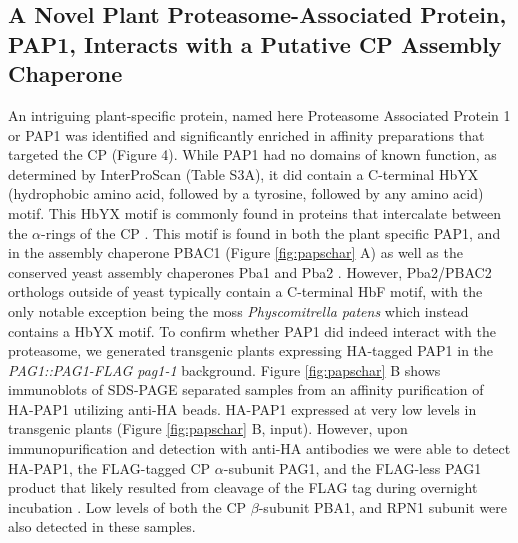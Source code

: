 \subsection{A Novel Plant Proteasome-Associated Protein, PAP1, Interacts with a Putative CP Assembly Chaperone}
An intriguing plant-specific protein, named here Proteasome Associated Protein 1 or PAP1 was identified and significantly enriched in affinity preparations that targeted the CP (Figure 4). While PAP1 had no domains of known function, as determined by InterProScan (Table S3A), it did contain a C-terminal HbYX (hydrophobic amino acid, followed by a tyrosine, followed by any amino acid) motif. This HbYX motif is commonly found in proteins that intercalate between the $\alpha$-rings of the CP \citep{kusmierczyk11}. This motif is found in both the plant specific PAP1, and in the assembly chaperone PBAC1 (Figure \ref{fig:papschar} A) as well as the conserved yeast assembly chaperones Pba1 and Pba2 \citep{kusmierczyk11}. However, Pba2/PBAC2 orthologs outside of yeast typically contain a C-terminal HbF motif, with the only notable exception being the moss \textit{Physcomitrella patens} which instead contains a HbYX motif.   To confirm whether PAP1 did indeed interact with the proteasome, we generated transgenic plants expressing HA-tagged PAP1 in the \textit{PAG1::PAG1-FLAG pag1-1} background. Figure \ref{fig:papschar} B shows immunoblots of SDS-PAGE separated samples from an affinity purification of HA-PAP1 utilizing anti-HA beads. HA-PAP1 expressed at very low levels in transgenic plants (Figure \ref{fig:papschar} B, input). However, upon immunopurification and detection with anti-HA antibodies we were able to detect HA-PAP1, the FLAG-tagged CP $\alpha$-subunit PAG1, and the FLAG-less PAG1 product that likely resulted from cleavage of the FLAG tag during overnight incubation \citep{book10}. Low levels of both the CP $\beta$-subunit PBA1, and RPN1 subunit were also detected in these samples. 

